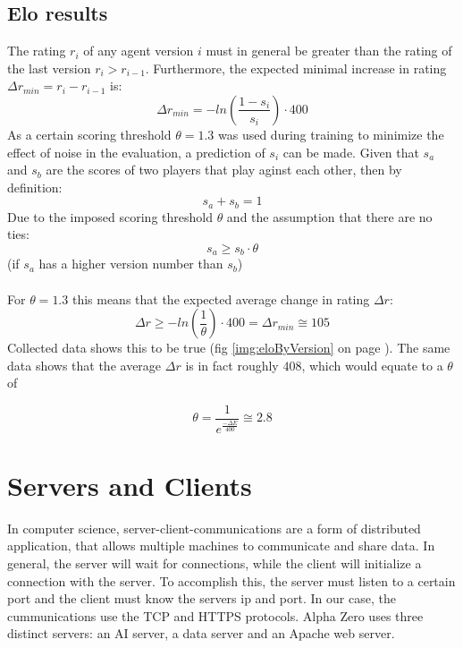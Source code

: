 \documentclass[12pt]{article}
\newcommand{\imgRef}[1]{(fig \ref{#1} on page \pageref{#1})}
\newcommand{\FittedEloRaiting}{408}
\newcommand{\FittedScoringThreshold}{2.8}
\begin{document}
\subsection{Elo results}
The rating \(r_i\) of any agent version \(i\) must in general be greater than the rating of the last version \(r_i > r_{i-1}\). Furthermore, the expected minimal increase in rating \(\Delta r_{min} = r_i - r_{i-1}\) is:
\begin{equation}
\Delta r_{min} = -ln\left(\frac{1-s_i}{s_i}\right)\cdot 400
\end{equation}
As a certain scoring threshold \(\theta = 1.3\) was used during training to minimize the effect of noise in the evaluation, a prediction of \(s_i\) can be made. Given that \(s_a\) and \(s_b\) are the scores of two players that play aginst each other, then by definition:
\begin{equation}
s_a + s_b = 1
\end{equation}
Due to the imposed scoring threshold \(\theta\) and the assumption that there are no ties:
\begin{equation}
s_a \geqslant s_b \cdot \theta
\end{equation}
(if \(s_a\) has a higher version number than \(s_b\))\\\\For \(\theta = 1.3\) this means that the expected average change in rating \(\Delta r\):
\begin{equation}
\Delta r \geqslant -ln\left(\frac{1}{\theta}\right)\cdot 400 = \Delta r_{min} \cong 105
\end{equation}
Collected data shows this to be true \imgRef{img:eloByVersion}. The same data shows that the average \(\Delta r \) is in fact roughly \(\FittedEloRaiting\), which would equate to a \(\theta\) of

\begin{equation}
\theta = \frac{1}{e^{\frac{-\Delta E}{400}}} \cong \FittedScoringThreshold
\end{equation}
\begin{center}
	
	\captionsetup{width=.8\linewidth}
	\label{img:eloByVersion}
\end{center}
\section{Servers and Clients}
In computer science, server-client-communications are a form of distributed application, that allows multiple machines to communicate and share data. In general, the server will wait for connections, while the client will initialize a connection with the server. To accomplish this, the server must listen to a certain port and the client must know the servers ip and port. In our case, the cummunications use the TCP and HTTPS protocols. Alpha Zero uses three distinct servers: an AI server, a data server and an Apache web server.
\end{document}
